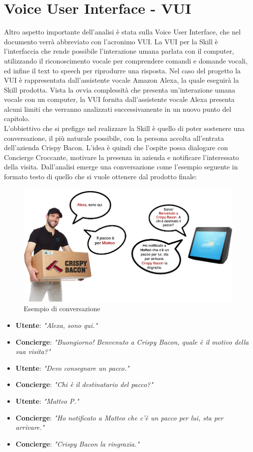 \section{Voice User Interface - VUI}
\label{vui}
Altro aspetto importante dell'analisi è stata sulla Voice User Interface, che nel documento verrà abbreviato con l'acronimo VUI. La VUI per la Skill è l’interfaccia che rende possibile l’interazione umana parlata con il computer, utilizzando il riconoscimento vocale per comprendere comandi e domande vocali, ed infine il text to speech per riprodurre una risposta. Nel caso del progetto la VUI è rappresentata dall'assistente vocale Amazon Alexa, la quale eseguirà la Skill prodotta. Vista la ovvia complessità che presenta un'interazione umana vocale con un computer, la VUI fornita dall'assistente vocale Alexa presenta alcuni limiti che verranno analizzati successivamente in un nuovo punto del capitolo.\\
L’obbiettivo che si prefigge nel realizzare la Skill è quello di poter sostenere una conversazione, il più naturale possibile, con la persona accolta all'entrata dell'azienda Crispy Bacon. L’idea è quindi che l’ospite possa dialogare con Concierge Croccante, motivare la presenza in azienda e notificare l’interessato della visita. Dall'analisi emerge una conversazione come l'esempio seguente in formato testo di quello che si vuole ottenere dal prodotto finale:
\begin{figure}[H] 
    \centering 
    \includegraphics[width=1\columnwidth]{immagini/esempioVUI.png}
    \caption{\label{fig:esempioVUI}Esempio di conversazione}
\end{figure}
\begin{itemize}
	\item \textbf{Utente}: \textit{"Alexa, sono qui."}
	\item \textbf{Concierge}: \textit{ "Buongiorno! Benvenuto a Crispy Bacon, quale è il motivo della sua visita?"}
	\item \textbf{Utente}: \textit{"Devo consegnare un pacco."}
	\item \textbf{Concierge}: \textit{ "Chi è il destinatario del pacco?"}
	\item \textbf{Utente}: \textit{"Matteo P."}
	\item \textbf{Concierge}: \textit{ "Ho notificato a Matteo che c'è un pacco per lui, sta per arrivare."}
	\item \textbf{Concierge}: \textit{ "Crispy Bacon la ringrazia."}
\end{itemize}
